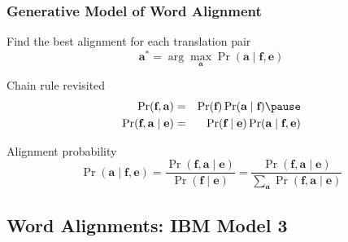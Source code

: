 \begin{frame}
\frametitle{Generative Model of Word Alignment}
\begin{block}{Find the best alignment for each translation pair}
\[ \textbf{a}^\ast = \arg\max_{\textbf{a}} \Pr(\textbf{a} \mid \textbf{f}, \textbf{e}) \]
\end{block}\pause
\begin{block}{Chain rule revisited}
\begin{eqnarray*}
\Pr( \textbf{f}, \textbf{a} ) & = & \Pr(\textbf{f}) \Pr(\textbf{a} \mid \textbf{f}) \pause \\
\Pr( \textbf{f}, \textbf{a} \mid \textbf{e} ) & = & \Pr(\textbf{f} \mid \textbf{e}) \Pr(\textbf{a} \mid \textbf{f}, \textbf{e}) 
\end{eqnarray*}
\end{block}
\begin{block}{Alignment probability}
\[ \Pr(\textbf{a} \mid \textbf{f}, \textbf{e}) = \frac{ \Pr( \textbf{f}, \textbf{a} \mid \textbf{e} ) }{ \Pr(\textbf{f} \mid \textbf{e}) } = \frac{ \Pr( \textbf{f}, \textbf{a} \mid \textbf{e} ) }{ \sum_{\textbf{a}} \Pr(\textbf{f}, \textbf{a} \mid \textbf{e}) } 
\]
\end{block}
\end{frame}

\subsection{Word Alignments: IBM Model 3}
\frame{\tableofcontents[currentsection]}

